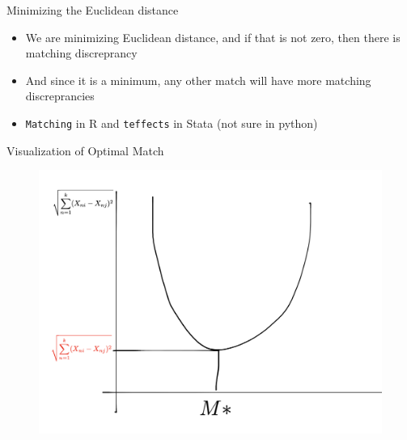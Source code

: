 \documentclass{beamer}
\begin{document}








\begin{frame}{Minimizing the Euclidean distance}

\begin{itemize}
\item We are minimizing Euclidean distance, and if that is not zero, then there is matching discreprancy
\item And since it is a minimum, any other match will have more matching discreprancies
\item \texttt{Matching} in R and \texttt{teffects} in Stata (not sure in python)
\end{itemize}

\end{frame}


\begin{frame}{Visualization of Optimal Match}

\begin{figure}[!t]\centering
\includegraphics[scale=0.35]{./lecture_includes/optimal_matches}
\end{figure}

\end{frame}
\end{document}
